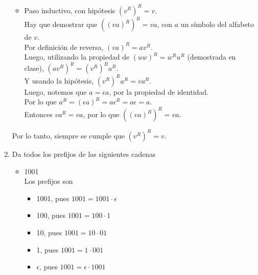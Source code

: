 \documentclass{article}
\begin{document}
\begin{enumerate}
{\begin{itemize}
{\begin{itemize}
                    \item {
                        Paso inductivo, con hipótesis $(v^R)^R = v$.\\
                        Hay que demostrar que $((va)^R)^R = va$, con $a$ un 
                        símbolo del alfabeto de $v$.\\
                        Por definición de reversa, $(va)^R = av^R$.\\
                        Luego, utilizando la propiedad de $(uw)^R = w^Ru^R$ 
                        (demostrada en clase), $(av^R)^R = (v^R)^Ra^R$.\\
                        Y usando la hipótesis, $(v^R)^Ra^R = va^R$.\\
                        Luego, notemos que $a = \epsilon a$, por la propiedad 
                        de identidad.\\
                        Por lo que $a^R = (\epsilon a)^R = 
                        a  \epsilon^R = a \epsilon = a$.\\
                        Entonces $va^R = va$, por lo que $((va)^R)^R = va$.
                    }
                \end{itemize}
                Por lo tanto, siempre se cumple que $(v^R)^R = v$.
            }
        \end{itemize}
    }

    \item {
        Da todos los prefijos de las siguientes cadenas

        \begin{itemize}
            \item {
                1001 \\
                Los prefijos son 
                \begin{itemize}
                    \item {
                        1001, pues $1001 = 1001 \cdot \epsilon$ 
                    }
                    \item {
                        100, pues $1001 = 100 \cdot 1$ 
                    }
                    \item {
                        10, pues $1001 = 10 \cdot 01$ 
                    }
                    \item {
                        1, pues $1001 = 1 \cdot 001$ 
                    }
                    \item {
                        $\epsilon$, pues $1001 = \epsilon \cdot 1001$ 
                    }
                \end{itemize}
            }


\end{itemize}}
\end{enumerate}
\end{document}

